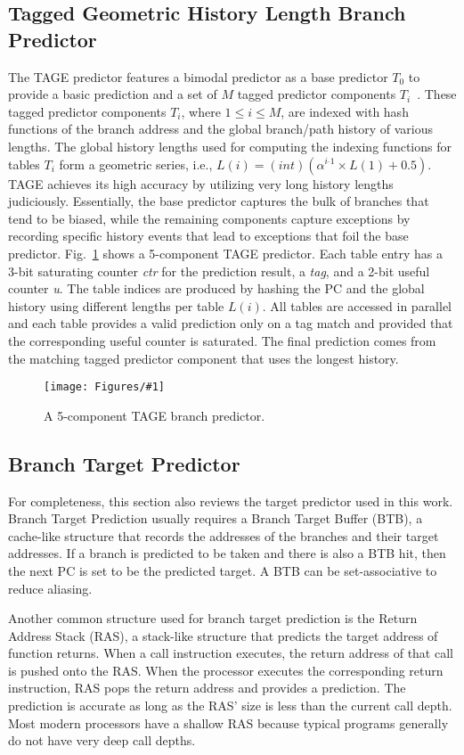 \documentclass[conference]{IEEEtran}
\newcommand{\kfig}[4]{ %
        \begin{figure}[!t]
        \centering
        \texttt{[image: Figures/\#1]}
        \vspace{-1mm}
        \caption{#3}
        \label{#2}
        \end{figure}
}
\begin{document}
\subsection{Tagged Geometric History Length Branch Predictor}
\label{sec:scheme:tage}
The TAGE predictor features a bimodal predictor as a base predictor $T_0$ to provide a basic prediction and a set of $M$ tagged predictor components $T_i$~\cite{tage}. These tagged predictor components $T_i$, where $1\leq i\leq M$, are indexed with hash functions of the branch address and the global branch/path history of various lengths. The global history lengths used for computing the indexing functions for tables $T_i$ form a geometric series, i.e., $L(i) = (int)(\alpha^{i{}^{\_}1}\times L(1)+0.5)$. TAGE achieves its high accuracy by utilizing very long history lengths judiciously.
Essentially, the base predictor captures the bulk of branches that tend to be biased, while the remaining components capture exceptions by recording specific history events that lead to exceptions that foil the base predictor.
Fig.~\ref{fig:tage} shows a 5-component TAGE predictor. Each table entry has a 3-bit saturating counter \textit{ctr} for the prediction result, a \textit{tag}, and a 2-bit useful counter \textit{u}. The table indices are produced by hashing the PC and the global history using different lengths per table $L(i)$. All tables are accessed in parallel and each table provides a valid prediction only on a tag match and provided that the corresponding useful counter is saturated. The final prediction comes from the matching tagged predictor component that uses the longest history.
\kfig{tage.pdf}{fig:tage}{A 5-component TAGE branch predictor.}{angle = 0, trim = 0.6in 0.6in 0.4in 0.2in, clip, width=0.35\textwidth}


\subsection{Branch Target Predictor}
\label{sec:scheme:target}
For completeness, this section also reviews the target predictor used in this work. Branch Target Prediction usually requires a Branch Target Buffer (BTB), a cache-like structure that records the addresses of the branches and their target addresses. If a branch is predicted to be taken and there is also a BTB hit, then the next PC is set to be the predicted target. A BTB can be set-associative to reduce aliasing.

Another common structure used for branch target prediction is the Return Address Stack (RAS),  a stack-like structure that predicts the target address of function returns. When a call instruction executes, the return address of that call is pushed onto the RAS. When the processor executes the corresponding return instruction, RAS pops the return address and provides a prediction. The prediction is accurate as long as the RAS' size is less than the current call depth. Most modern processors have a shallow RAS because typical programs generally do not have very deep call depths.
\end{document}

